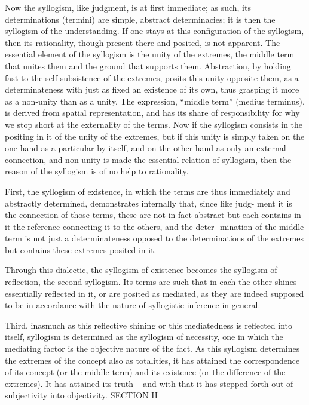 Now the syllogism, like judgment, is at first immediate; as such, its
determinations (termini) are simple, abstract determinacies; it is then the
syllogism of the understanding. If one stays at this configuration of the
syllogism, then its rationality, though present there and posited, is not
apparent. The essential element of the syllogism is the unity of the extremes,
the middle term that unites them and the ground that supports them.
Abstraction, by holding fast to the self-subsistence of the extremes, posits this
unity opposite them, as a determinateness with just as fixed an existence of its
own, thus grasping it more as a non-unity than as a unity. The expression,
“middle term” (medius terminus), is derived from spatial representation,
and has its share of responsibility for why we stop short at the externality
of the terms. Now if the syllogism consists in the positing in it of the unity
of the extremes, but if this unity is simply taken on the one hand as a
particular by itself, and on the other hand as only an external connection,
and non-unity is made the essential relation of syllogism, then the reason
of the syllogism is of no help to rationality.

First, the syllogism of existence, in which the terms are thus immediately
and abstractly determined, demonstrates internally that, since like judg-
ment it is the connection of those terms, these are not in fact abstract but
each contains in it the reference connecting it to the others, and the deter-
mination of the middle term is not just a determinateness opposed to the
determinations of the extremes but contains these extremes posited in it.

Through this dialectic, the syllogism of existence becomes the syllogism
of reflection, the second syllogism. Its terms are such that in each the other
shines essentially reflected in it, or are posited as mediated, as they are indeed
supposed to be in accordance with the nature of syllogistic inference in
general.

Third, inasmuch as this reflective shining or this mediatedness is reflected
into itself, syllogism is determined as the syllogism of necessity, one in which
the mediating factor is the objective nature of the fact. As this syllogism
determines the extremes of the concept also as totalities, it has attained the
correspondence of its concept (or the middle term) and its existence (or
the difference of the extremes). It has attained its truth – and with that it
has stepped forth out of subjectivity into objectivity.
SECTION II

